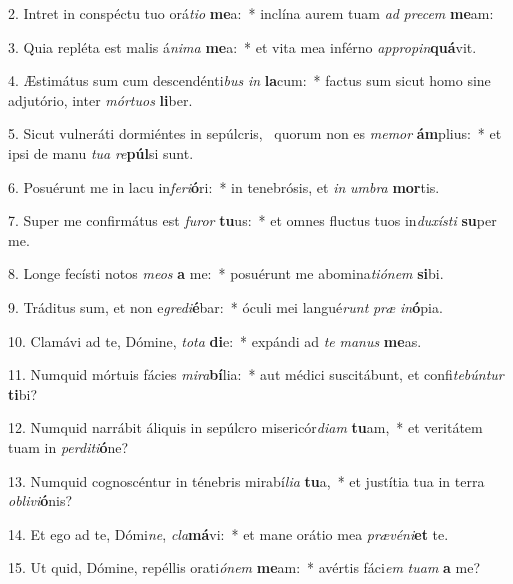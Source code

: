 2. Intret in conspéctu tuo orá\textit{ti}\textit{o} \textbf{me}a:~*  inclína aurem tuam \textit{ad} \textit{pre}\textit{cem} \textbf{me}am:\

3. Quia repléta est malis á\textit{ni}\textit{ma} \textbf{me}a:~*  et vita mea inférno \textit{ap}\textit{pro}\textit{pin}\textbf{quá}vit.\

4. Æstimátus sum cum descendénti\textit{bus} \textit{in} \textbf{la}cum:~*  factus sum sicut homo sine adjutório, inter \textit{mór}\textit{tu}\textit{os} \textbf{li}ber.\

5. Sicut vulneráti dormiéntes in sepúlcris, \dag\  quorum non es \textit{me}\textit{mor} \textbf{ám}plius:~*  et ipsi de manu \textit{tu}\textit{a} \textit{re}\textbf{púl}si sunt.\

6. Posuérunt me in lacu in\textit{fe}\textit{ri}\textbf{ó}ri:~*  in tenebrósis, et \textit{in} \textit{um}\textit{bra} \textbf{mor}tis.\

7. Super me confirmátus est \textit{fu}\textit{ror} \textbf{tu}us:~*  et omnes fluctus tuos in\textit{du}\textit{xís}\textit{ti} \textbf{su}per me.\

8. Longe fecísti notos \textit{me}\textit{os} \textbf{a} me:~*  posuérunt me abomina\textit{ti}\textit{ó}\textit{nem} \textbf{si}bi.\

9. Tráditus sum, et non e\textit{gre}\textit{di}\textbf{é}bar:~*  óculi mei langué\textit{runt} \textit{præ} \textit{in}\textbf{ó}pia.\

10. Clamávi ad te, Dómine, \textit{to}\textit{ta} \textbf{di}e:~*  expándi ad \textit{te} \textit{ma}\textit{nus} \textbf{me}as.\

11. Numquid mórtuis fácies \textit{mi}\textit{ra}\textbf{bí}lia:~*  aut médici suscitábunt, et confi\textit{te}\textit{bún}\textit{tur} \textbf{ti}bi?\

12. Numquid narrábit áliquis in sepúlcro misericór\textit{di}\textit{am} \textbf{tu}am,~*  et veritátem tuam in \textit{per}\textit{di}\textit{ti}\textbf{ó}ne?\

13. Numquid cognoscéntur in ténebris mirabí\textit{li}\textit{a} \textbf{tu}a,~*  et justítia tua in terra \textit{ob}\textit{li}\textit{vi}\textbf{ó}nis?\

14. Et ego ad te, Dómi\textit{ne}, \textit{cla}\textbf{má}vi:~*  et mane orátio mea \textit{præ}\textit{vé}\textit{ni}\textbf{et} te.\

15. Ut quid, Dómine, repéllis orati\textit{ó}\textit{nem} \textbf{me}am:~*  avértis fáci\textit{em} \textit{tu}\textit{am} \textbf{a} me?\

